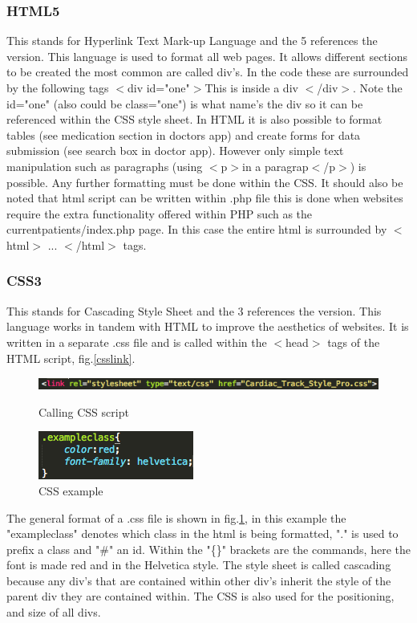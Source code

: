 \documentclass[11pt]{article}
\begin{document}
\subsubsection{HTML5}
This stands for Hyperlink Text Mark-up Language and the 5 references the version. This language is used to format all web pages. It allows different sections to be created the most common are called div's. In the code these are surrounded by the following tags $<$div id="one"$>$This is inside a div $<$/div$>$. Note the id="one" (also could be class="one") is what name's the div so it can be referenced within the CSS style sheet. In HTML it is also possible to format tables (see medication section in doctors app) and create forms for data submission (see search box in doctor app). However only simple text manipulation such as paragraphs (using $<$p$>$in a paragrap$<$/p$>$) is possible. Any further formatting must be done within the CSS. It should also be noted that html script can be written within .php file this is done when websites require the extra functionality offered within PHP such as the currentpatients/index.php page. In this case the entire html is surrounded by $<$html$>$ ... $<$/html$>$ tags. 
\subsubsection{CSS3}
This stands for Cascading Style Sheet and the 3 references the version. This language works in tandem with HTML to improve the aesthetics of websites. It is written in a separate .css file and is called within the $<$head$>$ tags of the HTML script, fig.\ref{csslink}. 
\begin{figure}[h!] 
\includegraphics[width=\linewidth]{csslink.png}
\caption{Calling CSS script \label{csslink}}
\endminipage\hfill
{}
\includegraphics[width=\linewidth]{exampleclass.png}
\caption{CSS example \label{CSSex}}
\endminipage
\end{figure} 
The general format of a .css file is shown in fig.\ref{CSSex}, in this example the "exampleclass" denotes which class in the html is being formatted, "." is used to prefix a class and "\#" an id. Within the "\{\}" brackets are the commands, here the font is made red and in the Helvetica style. The style sheet is called cascading because any div's that are contained within other div's inherit the style of the parent div they are contained within. The CSS is also used for the positioning, and size of all divs. 
\end{document}
